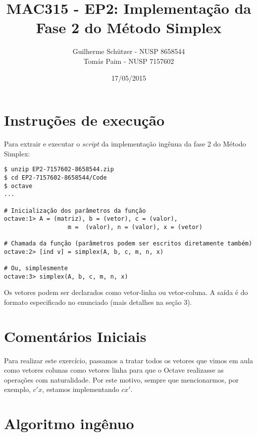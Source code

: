 \documentclass[a4paper]{article}
\title{MAC315 - EP2: Implementação da Fase 2 do Método Simplex}
\author{
	Guilherme Schützer - NUSP 8658544 \\
	Tomás Paim         - NUSP 7157602
}
\date{17/05/2015}
\begin{document}
\maketitle

\section{Instruções de execução}

Para extrair e executar o \emph{script} da implementação ingênua da fase 2 do Método Simplex:

\begin{verbatim}
$ unzip EP2-7157602-8658544.zip
$ cd EP2-7157602-8658544/Code
$ octave
...

# Inicialização dos parâmetros da função
octave:1> A = (matriz), b = (vetor), c = (valor),
		          m =  (valor), n = (valor), x = (vetor)

# Chamada da função (parâmetros podem ser escritos diretamente também)
octave:2> [ind v] = simplex(A, b, c, m, n, x)

# Ou, simplesmente
octave:3> simplex(A, b, c, m, n, x)

\end{verbatim}

Os vetores podem ser declarados como vetor-linha ou vetor-coluna. A saída é do formato especificado no enunciado (mais detalhes na seção 3).

\section{Comentários Iniciais}

\paragraph{}
Para realizar este exercício, passamos a tratar todos os vetores que vimos em aula como vetores colunas como vetores linha para que o Octave realizasse as operações com naturalidade. Por este motivo, sempre que mencionarmos, por exemplo, $c'x$, estamos implementando $cx'$.

\section{Algoritmo ingênuo}
\end{document}
